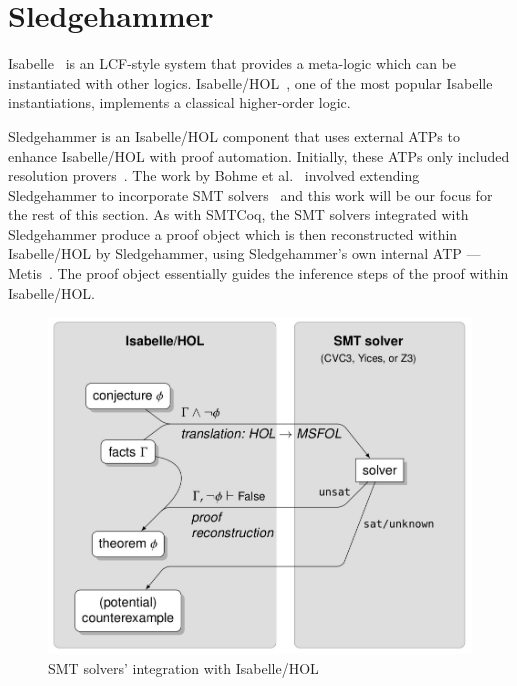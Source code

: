 \documentclass{article}
\begin{document}
	
	\section{Sledgehammer}
	\label{sec:hammer}
	Isabelle~\cite{DBLP:journals/corr/cs-LO-9301106} 
	is an LCF-style system that 
	provides a meta-logic which can be 
	instantiated with other logics.
	Isabelle/HOL~\cite{10.5555/1791547}, 
	one of the most popular Isabelle 
	instantiations, implements a 
	classical higher-order logic. 
	
	Sledgehammer is
	an Isabelle/HOL component that 
	uses external ATPs to enhance 
	Isabelle/HOL with proof 
	automation. Initially, these 
	ATPs only included resolution 
	provers~\cite{10.1007/978-3-642-39799-8_1}.
	The work by Bohme et 
	al.~\cite{bohme} involved 
	extending Sledgehammer to 
	incorporate SMT
	solvers~\cite{Barrett2018} and this 
	work will be our focus for the 
	rest of this section. As with 
	SMTCoq, the SMT solvers integrated
	with Sledgehammer produce a 
	proof object which is 
	then reconstructed within
	Isabelle/HOL by Sledgehammer, 
	using Sledgehammer's own internal 
	ATP --- Metis~\cite{hurd2003d}. The 
	proof object essentially guides 
	the inference steps of the proof 
	within Isabelle/HOL.
	
	\begin{figure}[t]
		\begin{center}
			\includegraphics[scale=0.3]{sledgehammer}
			\caption{SMT solvers' integration with 
			Isabelle/HOL}
			\label{fig:sledgehammer}
		\end{center}
	\end{figure}
\end{document}

